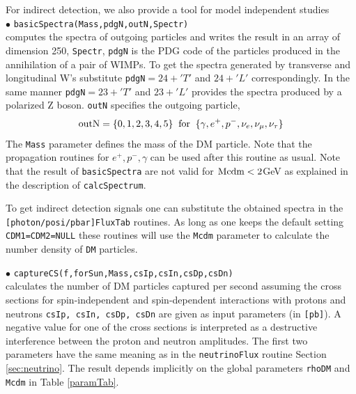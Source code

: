 \documentclass[12pt,a4paper]{article}
\begin{document}
For indirect detection, we also provide a tool for model independent studies\\ 
\noindent
$\bullet$ \verb|basicSpectra(Mass,pdgN,outN,Spectr)|\\
computes the spectra of outgoing particles and writes the result in an array of dimension 250, \verb|Spectr|,
\verb|pdgN| is the PDG code of the particles produced in the annihilation of a pair of 
WIMPs. To get the spectra generated by transverse and longitudinal W's substitute 
\verb|pdgN|$=24+'T'$ and $24+'L'$ correspondingly. In the same manner \verb|pdgN|$=23+'T'$ and
$23+'L'$  provides the spectra produced by a polarized Z boson.
 \verb|outN|  specifies the outgoing particle,
$$ {\rm outN} = \{0,1,2,3,4,5\} \;\; {\rm for}\;\; \{\gamma,   e^+,  p^-, \nu_e,
\nu_{\mu},\nu_{\tau}\} $$
The {\tt Mass} parameter defines the mass of the DM particle.
Note that the  propagation routines for $e^+,p^-,\gamma$ can be used after 
this routine as usual. Note that the result of {\tt basicSpectra}
are not valid for ${\rm Mcdm} < 2$GeV as explained in the description of {\tt calcSpectrum}.  

To get indirect detection signals one can substitute the obtained spectra in the\\ 
{\tt [photon/posi/pbar]FluxTab} routines. As long as one keeps the default setting  {\tt CDM1=CDM2=NULL} these routines will use the {\tt Mcdm} parameter to calculate the number density of {\tt DM} particles. 
  

\noindent $\bullet$ \verb|captureCS(f,forSun,Mass,csIp,csIn,csDp,csDn)|\\
calculates the number of DM particles captured per second assuming the cross sections
for  spin-independent and spin-dependent 
interactions with protons and neutrons   {\tt csIp, csIn, csDp, csDn} are
given as input parameters (in {\tt [pb]}). 
A negative value for one of the cross sections  is interpreted as a destructive
interference between the  proton and neutron amplitudes. The first two
parameters have the same meaning as in the {\tt neutrinoFlux} routine Section \ref{sec:neutrino}. The
result  depends implicitly on the global parameters {\tt rhoDM} and {\tt
Mcdm} in Table \ref{paramTab}. 
\end{document}
